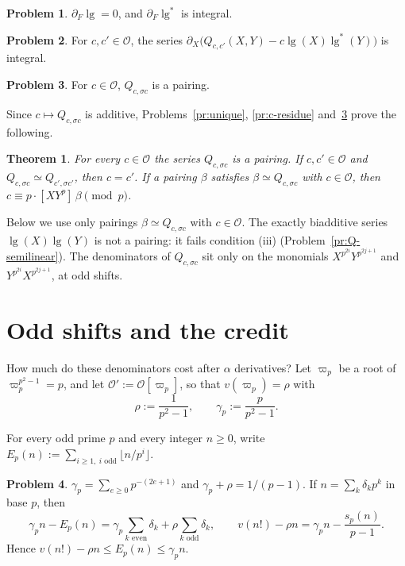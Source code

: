 \documentclass[reqno]{amsart}
\theoremstyle{definition}
\newtheorem{problem}{Problem}[section]
\theoremstyle{plain}
\newtheorem{theorem}{Theorem}[section]
\newcommand{\Oc}{\mathcal{O}}
\newcommand{\lgg}{\operatorname{lg}}
\begin{document}
\begin{problem}\label{pr:dlg}
\(\partial_F \lgg = 0\), and \(\partial_F \lgg^*\) is integral.
\end{problem}

\begin{problem}\label{pr:dX}
For \(c, c' \in \Oc\), the series \(\partial_X\bigl(Q_{c,c'}(X,Y) - c\lgg(X)\lgg^*(Y)\bigr)\) is integral.
\end{problem}

\begin{problem}\label{pr:Q-pairing}
For \(c \in \Oc\), \(Q_{c,\sigma c}\) is a pairing.
\end{problem}

Since \(c \mapsto Q_{c,\sigma c}\) is additive, Problems~\ref{pr:unique}, \ref{pr:c-residue} and~\ref{pr:Q-pairing} prove the following.

\begin{theorem}\label{thm:normal}
For every \(c \in \Oc\) the series \(Q_{c,\sigma c}\) is a pairing.  If \(c, c' \in \Oc\) and \(Q_{c,\sigma c} \simeq Q_{c',\sigma c'}\), then \(c = c'\).  If a pairing \(\beta\) satisfies \(\beta \simeq Q_{c,\sigma c}\) with \(c \in \Oc\), then \(c \equiv p \cdot [XY^p]\,\beta \pmod p\).
\end{theorem}

Below we use only pairings \(\beta \simeq Q_{c,\sigma c}\) with \(c \in \Oc\).  The exactly biadditive series \(\lgg(X)\lgg(Y)\) is not a pairing: it fails condition (iii) (Problem~\ref{pr:Q-semilinear}).  The denominators of \(Q_{c,\sigma c}\) sit only on the monomials \(X^{p^{2i}} Y^{p^{2j+1}}\) and \(Y^{p^{2i}} X^{p^{2j+1}}\), at odd shifts.

\section{Odd shifts and the credit}\label{sec:credit}

How much do these denominators cost after \(\alpha\) derivatives?  Let \(\varpi_p\) be a root of \(\varpi_p^{p^2-1} = p\), and let \(\Oc' := \Oc[\varpi_p]\), so that \(v(\varpi_p) = \rho\) with
\[
  \rho := \frac{1}{p^2-1},
  \qquad
  \gamma_p := \frac{p}{p^2-1} .
\]

For every odd prime \(p\) and every integer \(n \ge 0\), write \(E_p(n) := \sum_{i \ge 1,\ i \text{ odd}} \lfloor n/p^i \rfloor\).

\begin{problem}\label{pr:gamma}
\(\gamma_p = \sum_{e \ge 0} p^{-(2e+1)}\) and \(\gamma_p + \rho = 1/(p-1)\).  If \(n = \sum_k \delta_k p^k\) in base \(p\), then
\[
  \gamma_p n - E_p(n) = \gamma_p \sum_{k \text{ even}} \delta_k + \rho \sum_{k \text{ odd}} \delta_k,
  \qquad
  v(n!) - \rho n = \gamma_p n - \frac{s_p(n)}{p-1} .
\]
Hence \(v(n!) - \rho n \le E_p(n) \le \gamma_p n\).
\end{problem}
\end{document}
